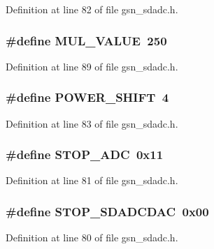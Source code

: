 Definition at line 82 of file gsn\_\-sdadc.h.

\hypertarget{a00583_a32393a10899a4ab9ead088201b7126d1}{
\subsubsection[{MUL\_\-VALUE}]{\setlength{\rightskip}{0pt plus 5cm}\#define MUL\_\-VALUE~250}}
\label{a00583_a32393a10899a4ab9ead088201b7126d1}


Definition at line 89 of file gsn\_\-sdadc.h.

\hypertarget{a00583_a41e27353ee072b0a2098a6fa65905953}{
\subsubsection[{POWER\_\-SHIFT}]{\setlength{\rightskip}{0pt plus 5cm}\#define POWER\_\-SHIFT~4}}
\label{a00583_a41e27353ee072b0a2098a6fa65905953}


Definition at line 83 of file gsn\_\-sdadc.h.

\hypertarget{a00583_a6f4b0c80c6a3b9513f283aba8c3efb56}{
\subsubsection[{STOP\_\-ADC}]{\setlength{\rightskip}{0pt plus 5cm}\#define STOP\_\-ADC~0x11}}
\label{a00583_a6f4b0c80c6a3b9513f283aba8c3efb56}


Definition at line 81 of file gsn\_\-sdadc.h.

\hypertarget{a00583_a845259d44644fdb49fa85ceb68ff0df0}{
\subsubsection[{STOP\_\-SDADCDAC}]{\setlength{\rightskip}{0pt plus 5cm}\#define STOP\_\-SDADCDAC~0x00}}
\label{a00583_a845259d44644fdb49fa85ceb68ff0df0}


Definition at line 80 of file gsn\_\-sdadc.h.



